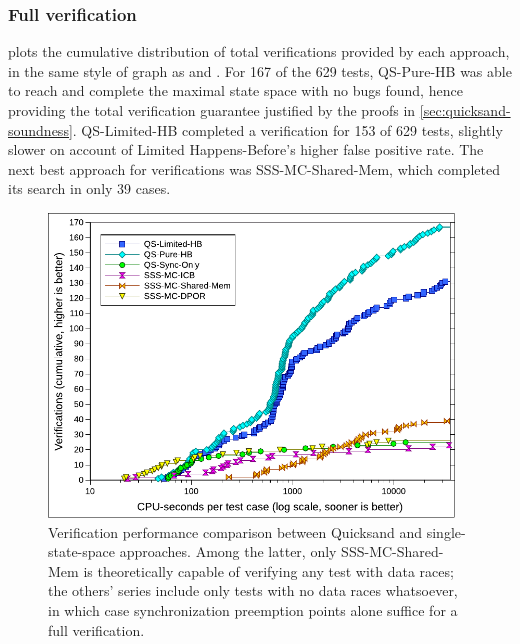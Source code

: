 \subsubsection{Full verification}

 plots the cumulative distribution of total verifications provided by each approach,
in the same style of graph as  and .
For 167 of the 629 tests,
QS-Pure-HB was able to reach and complete the maximal state space with no bugs found,
hence providing the total verification guarantee justified by the proofs in \cref{sec:quicksand-soundness}.
QS-Limited-HB completed a verification for 153 of 629 tests,
slightly slower on account of Limited Happens-Before's higher false positive rate.
The next best approach for verifications was SSS-MC-Shared-Mem, which completed its search in only 39 cases.

\begin{figure}[t]
	\begin{center}
	\includegraphics[width=0.96\textwidth]{../proposal/totalverifs-v2.pdf}
	\end{center}
	\caption[Verification performance comparison
	between Quicksand and prior work.]
	{Verification performance comparison between
	Quicksand and single-state-space approaches.
	Among the latter, only SSS-MC-Shared-Mem is theoretically capable of verifying any test with data races;
	the others' series include only tests with no data races whatsoever,
	in which case synchronization preemption points alone suffice for a full verification.}
	\label{fig:totalverif}
\end{figure}

